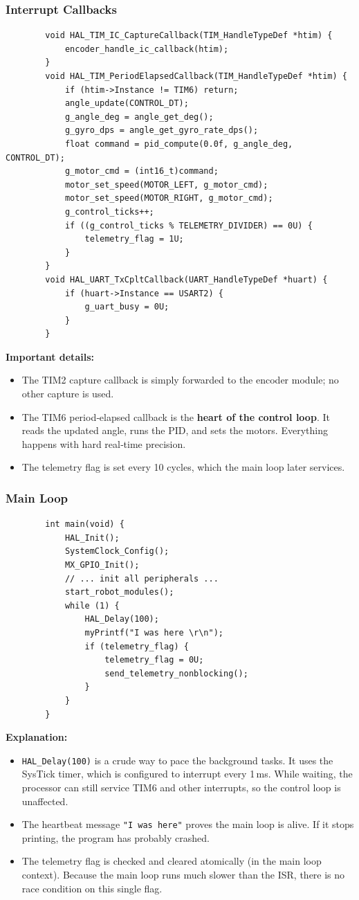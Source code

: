 \documentclass[12pt,a4paper]{article}
\begin{document}
	\subsubsection*{Interrupt Callbacks}
	\begin{lstlisting}
		void HAL_TIM_IC_CaptureCallback(TIM_HandleTypeDef *htim) {
			encoder_handle_ic_callback(htim);
		}
		void HAL_TIM_PeriodElapsedCallback(TIM_HandleTypeDef *htim) {
			if (htim->Instance != TIM6) return;
			angle_update(CONTROL_DT);
			g_angle_deg = angle_get_deg();
			g_gyro_dps = angle_get_gyro_rate_dps();
			float command = pid_compute(0.0f, g_angle_deg, CONTROL_DT);
			g_motor_cmd = (int16_t)command;
			motor_set_speed(MOTOR_LEFT, g_motor_cmd);
			motor_set_speed(MOTOR_RIGHT, g_motor_cmd);
			g_control_ticks++;
			if ((g_control_ticks % TELEMETRY_DIVIDER) == 0U) {
				telemetry_flag = 1U;
			}
		}
		void HAL_UART_TxCpltCallback(UART_HandleTypeDef *huart) {
			if (huart->Instance == USART2) {
				g_uart_busy = 0U;
			}
		}
	\end{lstlisting}
	\textbf{Important details:}
	\begin{itemize}
		\item The TIM2 capture callback is simply forwarded to the encoder module; no other capture is used.
		\item The TIM6 period‑elapsed callback is the \textbf{heart of the control loop}. It reads the updated angle, runs the PID, and sets the motors. Everything happens with hard real‑time precision.
		\item The telemetry flag is set every 10 cycles, which the main loop later services.
	\end{itemize}
	
	\subsubsection*{Main Loop}
	\begin{lstlisting}
		int main(void) {
			HAL_Init();
			SystemClock_Config();
			MX_GPIO_Init();
			// ... init all peripherals ...
			start_robot_modules();
			while (1) {
				HAL_Delay(100);
				myPrintf("I was here \r\n");
				if (telemetry_flag) {
					telemetry_flag = 0U;
					send_telemetry_nonblocking();
				}
			}
		}
	\end{lstlisting}
	\textbf{Explanation:}
	\begin{itemize}
		\item \texttt{HAL\_Delay(100)} is a crude way to pace the background tasks. It uses the SysTick timer, which is configured to interrupt every 1\,ms. While waiting, the processor can still service TIM6 and other interrupts, so the control loop is unaffected.
		\item The heartbeat message \texttt{"I was here"} proves the main loop is alive. If it stops printing, the program has probably crashed.
		\item The telemetry flag is checked and cleared atomically (in the main loop context). Because the main loop runs much slower than the ISR, there is no race condition on this single flag.
	\end{itemize}
	
\end{document}
